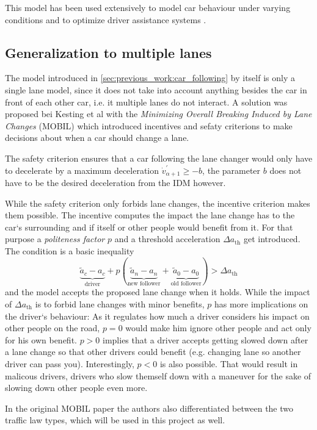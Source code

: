 This model has been used extensively to model car behaviour under varying conditions \cite{FIDM,CAPRANI2016207} and to optimize
driver assistance systems \cite{thesis_acc}.

\subsection{Generalization to multiple lanes}
\label{sec:previous_work:multiple_lanes}
The model introduced in \autoref{sec:previous_work:car_following} by itself is only a single lane model, since it does
not take into account anything besides the car in front of each other car, i.e. it multiple lanes do not interact. A
solution was proposed bei Kesting et al \cite{MOBIL} with the \textit{Minimizing Overall Breaking Induced by Lane
Changes} (MOBIL) which introduced incentives and sefaty criterions to make decisions about when a car should change a
lane.

The safety criterion ensures that a car following the lane changer would only have to decelerate by a maximum
deceleration $\dot v_{\alpha + 1}^\prime \geq -b$, the parameter $b$ does not have to be the desired deceleration from
the IDM however.

While the safety criterion only forbids lane changes, the incentive criterion makes them possible. The incentive
computes the impact the lane change has to the car`s surrounding and if itself or other people would benefit from it.
For that purpose a \textit{politeness factor} $p$ and a threshold acceleration $\Delta a_\text{th}$ get introduced. 
The condition is a basic inequality
\begin{equation}
  \underbrace{\tilde{a}_c - a_c}_\text{driver}
  + p (
  \underbrace{\tilde{a}_n - a_n}_\text{new follower}
  +
  \underbrace{\tilde{a}_0 - a_0}_\text{old follower}
  )
  > \Delta a_\text{th}
\end{equation}
and the model accepts the proposed lane change when it holds. While the impact of $\Delta a_\text{th}$ is to forbid lane
changes with minor benefits, $p$ has more implications on the driver`s behaviour: As it regulates how much a driver
considers his impact on other people on the road, $p=0$ would make him ignore other people and act only for his own
benefit. $p>0$ implies that a driver accepts getting slowed down after a lane change so that other drivers could
benefit (e.g. changing lane so another driver can pass you). Interestingly, $p<0$ is also possible. That would result in
malicous drivers, drivers who slow themself down with a maneuver for the sake of slowing down other people even
more. 

In the original MOBIL paper the authors also differentiated between the two traffic law types, which will be used in
this project as well.

